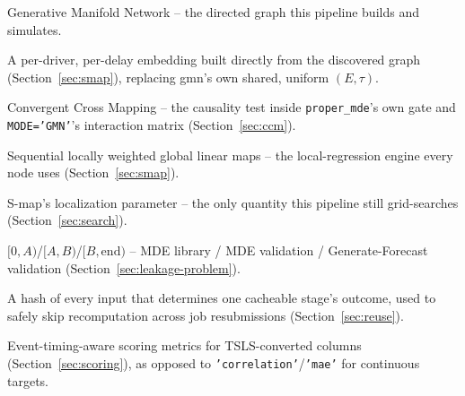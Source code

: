 \documentclass[11pt]{article}
\begin{document}
\begin{description}[leftmargin=3.2cm, style=nextline]
  \item[GMN] Generative Manifold Network -- the directed graph this pipeline builds and simulates.
  \item[Generalized embedding] A per-driver, per-delay embedding built directly from the discovered graph (Section~\ref{sec:smap}), replacing gmn's own shared, uniform $(E,\tau)$.
  \item[CCM] Convergent Cross Mapping -- the causality test inside \texttt{proper\_mde}'s own gate and \texttt{MODE='GMN'}'s interaction matrix (Section~\ref{sec:ccm}).
  \item[S-map] Sequential locally weighted global linear maps -- the local-regression engine every node uses (Section~\ref{sec:smap}).
  \item[$\theta$] S-map's localization parameter -- the only quantity this pipeline still grid-searches (Section~\ref{sec:search}).
  \item[Three-way split] $[0,A)$/$[A,B)$/$[B,\mathrm{end})$ -- MDE library / MDE validation / Generate-Forecast validation (Section~\ref{sec:leakage-problem}).
  \item[Fingerprint] A hash of every input that determines one cacheable stage's outcome, used to safely skip recomputation across job resubmissions (Section~\ref{sec:reuse}).
  \item[\texttt{'f1'} / \texttt{'gamma'}] Event-timing-aware scoring metrics for TSLS-converted columns (Section~\ref{sec:scoring}), as opposed to \texttt{'correlation'}/\texttt{'mae'} for continuous targets.
\end{description}
\end{document}
